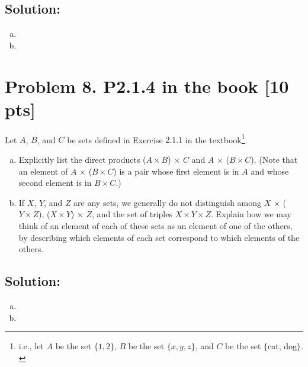 \documentclass[12pt]{article}
\begin{document}
\subsection*{\textbf{Solution:}}
\begin{enumerate}[(a)]
\item 
\item  
\end{enumerate}




\newpage

\section*{\textbf{Problem 8. P2.1.4 in the book} [10 pts]}
Let $A$, $B$, and $C$ be sets defined in Exercise $2.1.1$ in the textbook\footnote{i.e., let $A$ be the set $\{1, 2\}$, $B$ be the set $\{x, y, z\}$, and $C$ be the set $\{$cat, dog$\}.$}.  

\begin{enumerate}[(a)]
 \item Explicitly list the direct products ($A \times B$) $\times$ $C$ and $A$ $\times$ ($B \times C$). (Note that an element of $A$ $\times$ ($B \times C$) is a pair whose first element is in $A$ and whose second element is in $B \times C$.) 

\item If $X$, $Y$, and $Z$ are any sets, we generally do not distinguish among $X$ $\times$ ($Y \times Z$), ($X \times Y$) $\times$ $Z$, and the set of triples $X \times Y \times Z$. Explain how we may think of an element of each of these sets as an element of one of the others, by describing which elements of each set correspond to which elements of the others.
\end{enumerate}

\medskip

\subsection*{\textbf{Solution:}}

\begin{enumerate}[(a)]
  \item 
  \item
\end{enumerate}



\newpage
\end{document}

